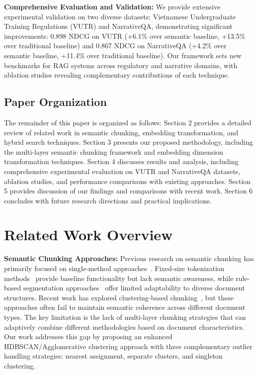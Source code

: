 \documentclass[10pt,twocolumn,letterpaper]{article}
\begin{document}
\vspace{0.5em}
\textbf{Comprehensive Evaluation and Validation:} We provide extensive experimental validation on two diverse datasets: Vietnamese Undergraduate Training Regulations (VUTR) and NarrativeQA, demonstrating significant improvements: 0.898 NDCG on VUTR (+6.1\% over semantic baseline, +13.5\% over traditional baseline) and 0.867 NDCG on NarrativeQA (+4.2\% over semantic baseline, +11.4\% over traditional baseline). Our framework sets new benchmarks for RAG systems across regulatory and narrative domains, with ablation studies revealing complementary contributions of each technique.

\subsection{Paper Organization}

The remainder of this paper is organized as follows: Section 2 provides a detailed review of related work in semantic chunking, embedding transformation, and hybrid search techniques. Section 3 presents our proposed methodology, including the multi-layer semantic chunking framework and embedding dimension transformation techniques. Section 4 discusses results and analysis, including comprehensive experimental evaluation on VUTR and NarrativeQA datasets, ablation studies, and performance comparisons with existing approaches. Section 5 provides discussion of our findings and comparisons with recent work. Section 6 concludes with future research directions and practical implications.

\section{Related Work Overview}

\textbf{Semantic Chunking Approaches:} Previous research on semantic chunking has primarily focused on single-method approaches~\cite{zhang2024semantic}. Fixed-size tokenization methods~\cite{smith2023fixed} provide baseline functionality but lack semantic awareness, while rule-based segmentation approaches~\cite{johnson2023rule} offer limited adaptability to diverse document structures. Recent work has explored clustering-based chunking~\cite{wilson2024clustering,mcinnes2017hdbscan,ward1963hierarchical}, but these approaches often fail to maintain semantic coherence across different document types. The key limitation is the lack of multi-layer chunking strategies that can adaptively combine different methodologies based on document characteristics. Our work addresses this gap by proposing an enhanced HDBSCAN/Agglomerative clustering approach with three complementary outlier handling strategies: nearest assignment, separate clusters, and singleton clustering.
\end{document}
